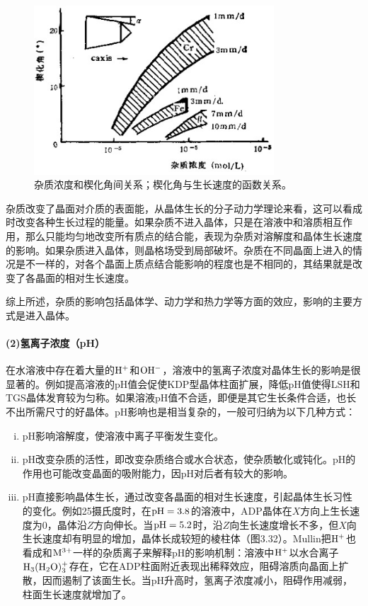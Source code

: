 \begin{figure}[htbp]
 \centering
 \includegraphics[width=0.8\textwidth]{fig/cp03/img3.31.jpg}
 \caption{杂质浓度和楔化角间关系；楔化角与生长速度的函数关系。}
\end{figure}

杂质改变了晶面对介质的表面能，从晶体生长的分子动力学理论来看，这可以看成时改变各种生长过程的能量。如果杂质不进入晶体，只是在溶液中和溶质相互作用，那么只能均匀地改变所有质点的结合能，表现为杂质对溶解度和晶体生长速度的影响。如果杂质进入晶体，则晶格场受到局部破坏。杂质在不同晶面上进入的情况是不一样的，对各个晶面上质点结合能影响的程度也是不相同的，其结果就是改变了各晶面的相对生长速度。

综上所述，杂质的影响包括晶体学、动力学和热力学等方面的效应，影响的主要方式是进入晶体。


\paragraph{(2)氢离子浓度（pH）}在水溶液中存在着大量的$\rm H^+$和$\rm OH^-$，溶液中的氢离子浓度对晶体生长的影响是很显著的。例如提高溶液的pH值会促使KDP型晶体柱面扩展，降低pH值使得LSH和TGS晶体发育较为匀称。如果溶液pH值不合适，即便是其它生长条件合适，也长不出所需尺寸的好晶体。pH影响也是相当复杂的，一般可归纳为以下几种方式：
\begin{enumerate}[(i)]\itemsep -0.5ex
\item pH影响溶解度，使溶液中离子平衡发生变化。
\item pH改变杂质的活性，即改变杂质络合或水合状态，使杂质敏化或钝化。pH的作用也可能改变晶面的吸附能力，因pH对后者有较大的影响。
\item pH直接影响晶体生长，通过改变各晶面的相对生长速度，引起晶体生长习性的变化。例如25摄氏度时，在$\rm pH=3.8$的溶液中，ADP晶体在$X$方向上生长速度为0，晶体沿$Z$方向伸长。当$\rm pH=5.2$时，沿$Z$向生长速度增长不多，但$X$向生长速度却有明显的增加，晶体长成较短的棱柱体（图3.32）。Mullin把$\rm H^+$也看成和$\rm M^{3+}$一样的杂质离子来解释pH的影响机制：溶液中$\rm H^+$以水合离子$\rm H_3(H_2O)_3^+$存在，它在ADP柱面附近表现出稀释效应，阻碍溶质向晶面上扩散，因而遏制了该面生长。当pH升高时，氢离子浓度减小，阻碍作用减弱，柱面生长速度就增加了。
\end{enumerate}


